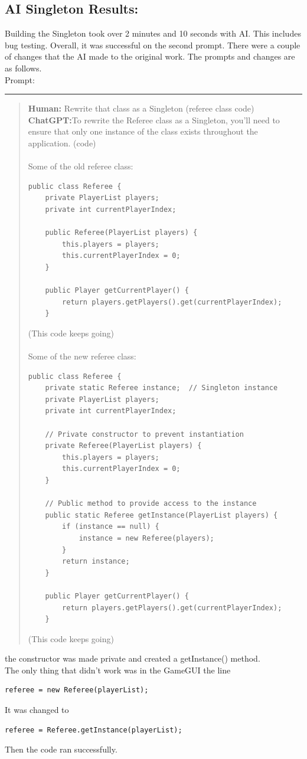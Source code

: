 \documentclass[a4paper,11pt]{article}
\begin{document}
\subsection*{AI Singleton Results:}
Building the Singleton took over 2 minutes and 10 seconds with AI. This includes bug testing. Overall, it was successful on the second prompt. There were a couple of changes that the AI made to the original work. The prompts and changes are as follows.\\
Prompt:
\hrule
\vspace{4pt} %
\begin{quote}
\textbf{Human:} Rewrite that class as a Singleton (referee class code) \\
\textbf{ChatGPT:}To rewrite the Referee class as a Singleton, you'll need to ensure that only one instance of the class exists throughout the application. (code) \\\\
Some of the old referee class:
\begin{lstlisting}
public class Referee {
    private PlayerList players;
    private int currentPlayerIndex;
    
    public Referee(PlayerList players) {
        this.players = players;
        this.currentPlayerIndex = 0;
    }

    public Player getCurrentPlayer() {
        return players.getPlayers().get(currentPlayerIndex);
    }

\end{lstlisting} (This code keeps going) \\\\
Some of the new  referee class: \begin{lstlisting}
public class Referee {
    private static Referee instance;  // Singleton instance
    private PlayerList players;
    private int currentPlayerIndex;

    // Private constructor to prevent instantiation
    private Referee(PlayerList players) {
        this.players = players;
        this.currentPlayerIndex = 0;
    }

    // Public method to provide access to the instance
    public static Referee getInstance(PlayerList players) {
        if (instance == null) {
            instance = new Referee(players);
        }
        return instance;
    }

    public Player getCurrentPlayer() {
        return players.getPlayers().get(currentPlayerIndex);
    }
\end{lstlisting}
(This code keeps going)
\end{quote}
the constructor was made private and created a getInstance() method. \\
The only thing that didn't work was in the GameGUI the line
\begin{lstlisting}
referee = new Referee(playerList);
\end{lstlisting} It was changed to \begin{lstlisting}
referee = Referee.getInstance(playerList);
\end{lstlisting} Then the code ran successfully.
\end{document}
